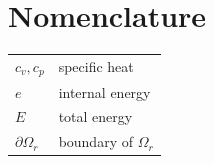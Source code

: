 \documentclass[journal,final]{new-aiaa}
\begin{document}
\begin{abstract}
\end{abstract}

\section*{Nomenclature}
{\renewcommand\arraystretch{1.0}
\noindent\begin{longtable*}{@{}l @{\quad=\quad} l@{}}
$c_v,c_p$   & specific heat \\
$e$     & internal energy\\
$E$     & total energy\\

$\partial \Omega_r$& boundary of $\Omega_r$
\end{longtable*}}
\end{document}
